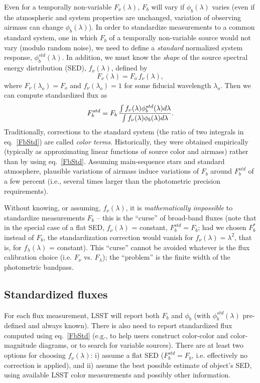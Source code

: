 \documentclass[PST,toc]{lsstdoc}
\begin{document}
Even for a temporally non-variable $F_\nu(\lambda)$,  $F_b$ will vary if
$\phi_b(\lambda)$ varies (even if the atmospheric and system properties
are unchanged, variation of observing airmass can change $\phi_b(\lambda)$).
In order to standardize measurements to a
common standard system, one in which $F_b$ of a temporally non-variable
source would not vary (modulo random noise),  we need to define a \textit{standard}
normalized system response, $\phi^{std}_b(\lambda)$. In addition, we must know the \textit{shape}
of the source spectral energy distribution (SED), $f_\nu(\lambda)$, defined by
\begin{equation}
        F_\nu(\lambda) = F_o \, f_\nu(\lambda),
\end{equation}
where $F_\nu(\lambda_o) = F_o$ and $f_\nu(\lambda_o) = 1$ for some fiducial
wavelength $\lambda_o$. Then we can compute standardized flux as
\begin{equation}
\label{FbStd}
F^{std}_b =  F_b \, {\int{f_\nu(\lambda)  \phi^{std}_b(\lambda) d\lambda }  \over   \int{ f_\nu(\lambda) \phi_b(\lambda) d\lambda }}.
\end{equation}
Traditionally, corrections to the standard system (the ratio of two integrals in eq.~\ref{FbStd})
are called \textit{color terms}. Historically, they were obtained empirically (typically as approximating
linear functions of source color and airmass) rather than by using eq.~\ref{FbStd}. Assuming
main-sequence stars and standard atmosphere, plausible variations of airmass induce variations
of $F_b$ around $F^{std}_b$ of a few percent (i.e., several times larger than the photometric
precision requirements).

Without knowing, or assuming, $f_\nu(\lambda)$, it is \textit{mathematically impossible}  to
standardize measurements $F_b$ -- this is the ``curse'' of broad-band fluxes
(note that in the special case of a flat SED, $f_\nu(\lambda)$ = constant, $F^{std}_b =  F_b$;
had we chosen $F_b^\ast$ instead of $F_b$, the standardization correction would vanish for
$f_\nu(\lambda) = \lambda^2$, that is, for $f_\lambda(\lambda)$ = constant).
This ``curse'' cannot be avoided whatever is the flux calibration choice (i.e. $F_\nu$ vs. $F_\lambda$);
the ``problem'' is the finite width of the photometric bandpass.


\subsection{Standardized fluxes}

For each flux measurement, LSST will report both $F_b$ and $\phi_b$ (with $\phi^{std}_b(\lambda)$
pre-defined and always known). There is also need to report standardized flux
computed using eq.~\ref{FbStd} (e.g., to help users construct color-color and color-magnitude
diagrams, or to search for variable sources). There are at least two options for choosing $f_\nu(\lambda)$:
i) assume a flat SED ($F^{std}_b =  F_b$, i.e. effectively no correction is applied), and ii) assume
the best possible estimate of object's SED, using available LSST color measurements and possibly
other information.
\end{document}
